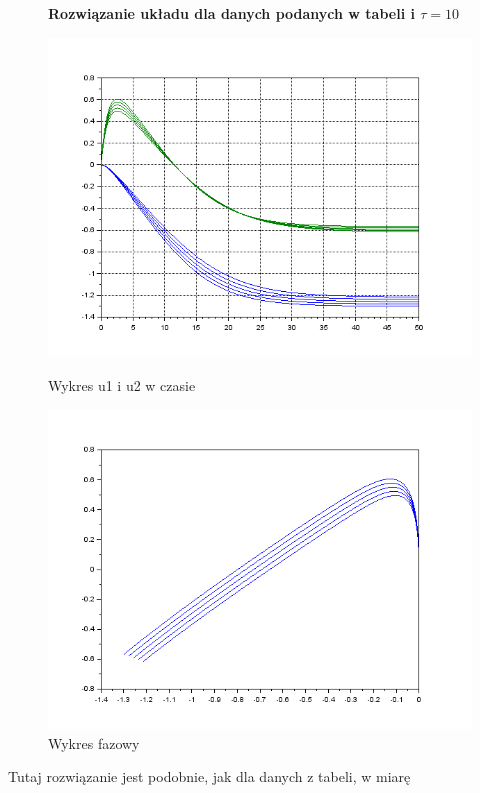 \documentclass[12pt]{article}
\begin{document}
\begin{figure}[H]
\textbf{Rozwiązanie układu dla danych podanych w tabeli i $\tau = 10$}
  \centering
  \begin{minipage}[b]{0.49\textwidth}
    \includegraphics[scale=0.4]{./img/3-1-tau2-xy}
    \caption{Wykres u1 i u2 w czasie}
    \end{minipage}
  \hfill
  \begin{minipage}[b]{0.49\textwidth}
    \includegraphics[scale=0.4]{./img/3-1-tau2-phase}
    \caption{Wykres fazowy}
  \end{minipage}
\end{figure}
Tutaj rozwiązanie jest podobnie, jak dla danych z tabeli, w miarę 
\end{document}
